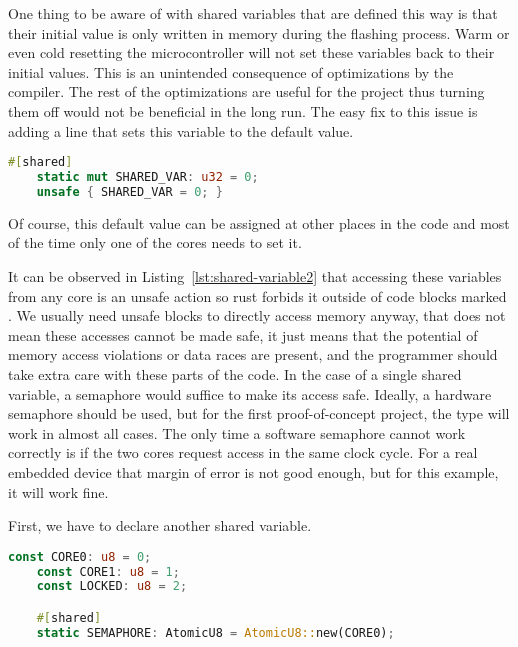 One thing to be aware of with shared variables that are defined this way is that their initial value is only written in memory during the flashing process. Warm or even cold resetting the microcontroller will not set these variables back to their initial values. This is an unintended consequence of optimizations by the compiler. The rest of the optimizations are useful for the project thus turning them off would not be beneficial in the long run. The easy fix to this issue is adding a line that sets this variable to the default value.

\begin{lstlisting}[language=Rust,frame=single,float=!ht,style=customrust,label={lst:shared-variable2},caption={Shared Variable Example With Default Value}]
    #[shared]
    static mut SHARED_VAR: u32 = 0;
    unsafe { SHARED_VAR = 0; }
\end{lstlisting}

Of course, this default value can be assigned at other places in the code and most of the time only one of the cores needs to set it.

It can be observed in Listing~\ref{lst:shared-variable2} that accessing these variables from any core is an unsafe action so rust forbids it outside of code blocks marked . We usually need unsafe blocks to directly access memory anyway, that does not mean these accesses cannot be made safe, it just means that the potential of memory access violations or data races are present, and the programmer should take extra care with these parts of the code. In the case of a single shared variable, a semaphore would suffice to make its access safe. Ideally, a hardware semaphore should be used, but for the first proof-of-concept project, the  type will work in almost all cases. The only time a software semaphore cannot work correctly is if the two cores request access in the same clock cycle. For a real embedded device that margin of error is not good enough, but for this example, it will work fine.

First, we have to declare another shared variable.

\begin{lstlisting}[language=Rust,frame=single,float=!ht,style=customrust,label={lst:sw-semaphore1},caption={Software Semaphore Variables}]
    const CORE0: u8 = 0;
    const CORE1: u8 = 1;
    const LOCKED: u8 = 2;

    #[shared]
    static SEMAPHORE: AtomicU8 = AtomicU8::new(CORE0);
\end{lstlisting}

